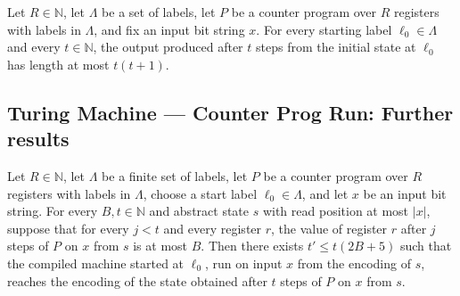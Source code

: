 \begin{theorem}
\label{Complexity.CounterProg.run_init_out_le}
\leanok
{}
Let $R\in\mathbb{N}$, let $\Lambda$ be a set of labels, let $P$ be a counter program
over $R$ registers with labels in $\Lambda$, and fix an input bit string $x$. For every
starting label $\ell_0\in\Lambda$ and every $t\in\mathbb{N}$, the output produced after
$t$ steps from the initial state at $\ell_0$ has length at most $t(t+1)$.
\end{theorem}

\subsection*{Turing Machine --- Counter Prog Run: Further results}

\begin{theorem}
\label{Complexity.CounterProg.sim_run_of_regs_le}
\leanok
{}
Let $R\in\mathbb{N}$, let $\Lambda$ be a finite set of labels, let $P$ be a counter
program over $R$ registers with labels in $\Lambda$, choose a start label
$\ell_0\in\Lambda$, and let $x$ be an input bit string. For every $B,t\in\mathbb{N}$ and
abstract state $s$ with read position at most $|x|$, suppose that for every $j<t$ and
every register $r$, the value of register $r$ after $j$ steps of $P$ on $x$ from $s$ is
at most $B$. Then there exists $t'\le t(2B+5)$ such that the compiled machine started at
$\ell_0$, run on input $x$ from the encoding of $s$, reaches the encoding of the state
obtained after $t$ steps of $P$ on $x$ from $s$.
\end{theorem}
